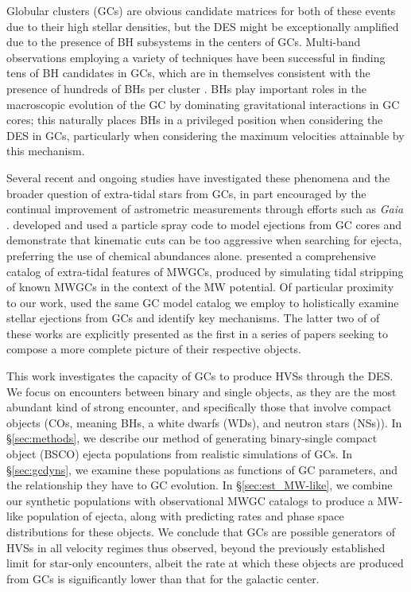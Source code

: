 \documentclass[twocolumn,linenumbers]{aastex631}
\begin{document}
Globular clusters (GCs) are obvious candidate matrices for both of these events due to their high stellar densities, but the DES might be exceptionally amplified due to the presence of BH subsystems in the centers of GCs.
Multi-band observations \citep{Maccarone2007a, Barnard2011, Chomiuk2013, Miller-Jones2015a} employing a variety of techniques \citep{Strader2012, Bahramian2016, Giesers2018} have been successful in finding tens of BH candidates in GCs, which are in themselves consistent with the presence of hundreds of BHs per cluster \citep{2018ApJ...855L..15K, Giesers2019}.
BHs play important roles in the macroscopic evolution of the GC \citep[e.g.][]{2020IAUS..351..357K} by dominating gravitational interactions in GC cores; this naturally places BHs in a privileged position when considering the DES in GCs, particularly when considering the maximum velocities attainable by this mechanism.

Several recent and ongoing studies have investigated these phenomena and the broader question of extra-tidal stars from GCs, in part encouraged by the continual improvement of astrometric measurements through efforts such as \textit{Gaia} \citep{2022arXiv220800211G}.
\citet{2023MNRAS.518.4249G} developed and used a particle spray code to model ejections from GC cores and demonstrate that kinematic cuts can be too aggressive when searching for ejecta, preferring the use of chemical abundances alone.
\citet{2023arXiv230105166F} presented a comprehensive catalog of extra-tidal features of MWGCs, produced by simulating tidal stripping of known MWGCs in the context of the MW potential.
Of particular proximity to our work, \citet{2022arXiv221116523W} used the same GC model catalog we employ to holistically examine stellar ejections from GCs and identify key mechanisms.
The latter two of of these works are explicitly presented as the first in a series of papers seeking to compose a more complete picture of their respective objects.

This work investigates the capacity of GCs to produce HVSs through the DES.
We focus on encounters between binary and single objects, as they are the most abundant kind of strong encounter, and specifically those that involve compact objects (COs, meaning BHs, a white dwarfs (WDs), and neutron stars (NSs)).
In \S\ref{sec:methods}, we describe our method of generating binary-single compact object (BSCO) ejecta populations from realistic simulations of GCs.
In \S\ref{sec:gcdyns}, we examine these populations as functions of GC parameters, and the relationship they have to GC evolution.
In \S\ref{sec:est_MW-like}, we combine our synthetic populations with observational MWGC catalogs to produce a MW-like population of ejecta, along with predicting rates and phase space distributions for these objects.
We conclude that GCs are possible generators of HVSs in all velocity regimes thus observed, beyond the previously established limit for star-only encounters, albeit the rate at which these objects are produced from GCs is significantly lower than that for the galactic center.
\end{document}

